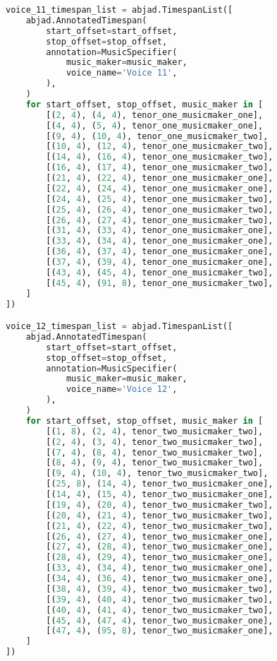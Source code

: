 \begin{lstlisting}[language=Python, caption=Invocation Source Code]
voice_11_timespan_list = abjad.TimespanList([
    abjad.AnnotatedTimespan(
        start_offset=start_offset,
        stop_offset=stop_offset,
        annotation=MusicSpecifier(
            music_maker=music_maker,
            voice_name='Voice 11',
        ),
    )
    for start_offset, stop_offset, music_maker in [
        [(2, 4), (4, 4), tenor_one_musicmaker_one],
        [(4, 4), (5, 4), tenor_one_musicmaker_one],
        [(9, 4), (10, 4), tenor_one_musicmaker_two],
        [(10, 4), (12, 4), tenor_one_musicmaker_two],
        [(14, 4), (16, 4), tenor_one_musicmaker_two],
        [(16, 4), (17, 4), tenor_one_musicmaker_two],
        [(21, 4), (22, 4), tenor_one_musicmaker_one],
        [(22, 4), (24, 4), tenor_one_musicmaker_one],
        [(24, 4), (25, 4), tenor_one_musicmaker_two],
        [(25, 4), (26, 4), tenor_one_musicmaker_two],
        [(26, 4), (27, 4), tenor_one_musicmaker_two],
        [(31, 4), (33, 4), tenor_one_musicmaker_one],
        [(33, 4), (34, 4), tenor_one_musicmaker_one],
        [(36, 4), (37, 4), tenor_one_musicmaker_one],
        [(37, 4), (39, 4), tenor_one_musicmaker_one],
        [(43, 4), (45, 4), tenor_one_musicmaker_two],
        [(45, 4), (91, 8), tenor_one_musicmaker_two],
    ]
])

voice_12_timespan_list = abjad.TimespanList([
    abjad.AnnotatedTimespan(
        start_offset=start_offset,
        stop_offset=stop_offset,
        annotation=MusicSpecifier(
            music_maker=music_maker,
            voice_name='Voice 12',
        ),
    )
    for start_offset, stop_offset, music_maker in [
        [(1, 8), (2, 4), tenor_two_musicmaker_two],
        [(2, 4), (3, 4), tenor_two_musicmaker_two],
        [(7, 4), (8, 4), tenor_two_musicmaker_two],
        [(8, 4), (9, 4), tenor_two_musicmaker_two],
        [(9, 4), (10, 4), tenor_two_musicmaker_two],
        [(25, 8), (14, 4), tenor_two_musicmaker_one],
        [(14, 4), (15, 4), tenor_two_musicmaker_one],
        [(19, 4), (20, 4), tenor_two_musicmaker_two],
        [(20, 4), (21, 4), tenor_two_musicmaker_two],
        [(21, 4), (22, 4), tenor_two_musicmaker_two],
        [(26, 4), (27, 4), tenor_two_musicmaker_one],
        [(27, 4), (28, 4), tenor_two_musicmaker_one],
        [(28, 4), (29, 4), tenor_two_musicmaker_one],
        [(33, 4), (34, 4), tenor_two_musicmaker_one],
        [(34, 4), (36, 4), tenor_two_musicmaker_one],
        [(38, 4), (39, 4), tenor_two_musicmaker_two],
        [(39, 4), (40, 4), tenor_two_musicmaker_two],
        [(40, 4), (41, 4), tenor_two_musicmaker_two],
        [(45, 4), (47, 4), tenor_two_musicmaker_one],
        [(47, 4), (95, 8), tenor_two_musicmaker_one],
    ]
])


\end{lstlisting}
